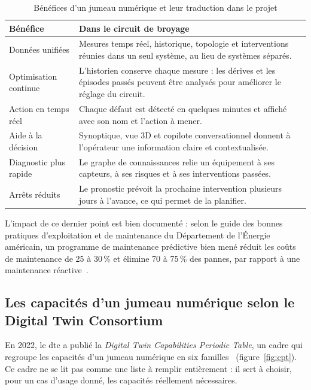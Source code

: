 \begin{table}[H]
\centering
\caption{Bénéfices d'un jumeau numérique et leur traduction dans le projet}
\label{tab:benefices}
\begin{tabularx}{\textwidth}{>{\raggedright\arraybackslash}p{3.6cm} X}
\toprule
\textbf{Bénéfice} & \textbf{Dans le circuit de broyage} \\
\midrule
Données unifiées & Mesures temps réel, historique, topologie et interventions réunies dans un seul système, au lieu de systèmes séparés. \\
Optimisation continue & L'historien conserve chaque mesure : les dérives et les épisodes passés peuvent être analysés pour améliorer le réglage du circuit. \\
Action en temps réel & Chaque défaut est détecté en quelques minutes et affiché avec son nom et l'action à mener. \\
Aide à la décision & Synoptique, vue 3D et copilote conversationnel donnent à l'opérateur une information claire et contextualisée. \\
Diagnostic plus rapide & Le graphe de connaissances relie un équipement à ses capteurs, à ses risques et à ses interventions passées. \\
Arrêts réduits & Le pronostic prévoit la prochaine intervention plusieurs jours à l'avance, ce qui permet de la planifier. \\
\bottomrule
\end{tabularx}
\end{table}

L'impact de ce dernier point est bien documenté : selon le guide des bonnes pratiques d'exploitation et de maintenance du Département de l'Énergie américain, un programme de maintenance prédictive bien mené réduit les coûts de maintenance de 25 à 30\,\% et élimine 70 à 75\,\% des pannes, par rapport à une maintenance réactive~\cite{doeom}.

\subsection{Les capacités d'un jumeau numérique selon le Digital Twin Consortium}
En 2022, le \gls{dtc} a publié la \textit{Digital Twin Capabilities Periodic Table}, un cadre qui regroupe les capacités d'un jumeau numérique en six familles~\cite{dtccpt} (figure~\ref{fig:cpt}). Ce cadre ne se lit pas comme une liste à remplir entièrement : il sert à choisir, pour un cas d'usage donné, les capacités réellement nécessaires.

